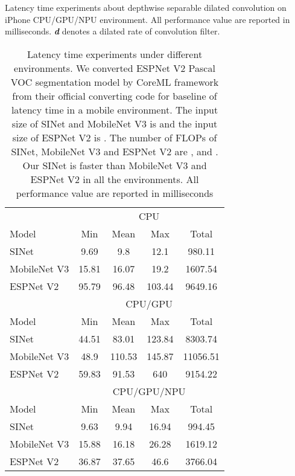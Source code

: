 \documentclass[10pt,twocolumn,letterpaper]{article}
\begin{document}
\begin{table}[ht]
  \caption{Latency time experiments about depthwise separable dilated convolution on iPhone CPU/GPU/NPU environment. All performance value are reported in milliseconds. \textit{\textbf{d}} denotes a dilated rate of convolution filter.}
   \label{tab:latency1}\end{table}


\begin{table}[ht]
   \begin{center}
\scriptsize
       
    \begin{tabular*}{0.45\textwidth}{@{\extracolsep{\fill}}l ||  cccc}
          & \multicolumn{4}{c}{CPU} \\
         
    Model  &  Min  &  Mean & Max   & Total \\
    \hline  \hline 
    SINet & 9.69  & 9.8   & 12.1  & 980.11 \\
    MobileNet V3 & 15.81 & 16.07 & 19.2  & 1607.54 \\
    ESPNet V2 & 95.79 & 96.48 & 103.44 & 9649.16 \\
     \hline \hline
          & \multicolumn{4}{c}{CPU/GPU} \\
           Model  &  Min  &  Mean & Max   & Total \\
           \hline   \hline 
    SINet & 44.51 & 83.01 & 123.84 & 8303.74 \\
    MobileNet V3 & 48.9  & 110.53 & 145.87 & 11056.51 \\
    ESPNet V2 & 59.83 & 91.53 & 640   & 9154.22 \\
    \hline \hline
          & \multicolumn{4}{c}{CPU/GPU/NPU} \\
           Model  &  Min  &  Mean & Max   & Total \\
           \hline   \hline 
    SINet & 9.63  & 9.94  & 16.94 & 994.45 \\
    MobileNet V3 & 15.88 & 16.18 & 26.28 & 1619.12 \\
    ESPNet V2 & 36.87 & 37.65 & 46.6  & 3766.04 \\
    
    \end{tabular*}\end{center}
  
    \caption{Latency time experiments under different environments. 
    We converted ESPNet V2 Pascal VOC segmentation model by CoreML framework from their official converting code for baseline of latency time in a mobile environment.  
    The input size of SINet and MobileNet V3 is  and the input size of ESPNet V2 is .
    The number of FLOPs of SINet, MobileNet V3 and ESPNet V2  are ,  and  .
    Our SINet is faster than MobileNet V3 and ESPNet V2 in all the environments.
    All performance value are reported in milliseconds}
    
    \label{tab:latency2}\end{table}
\end{document}
